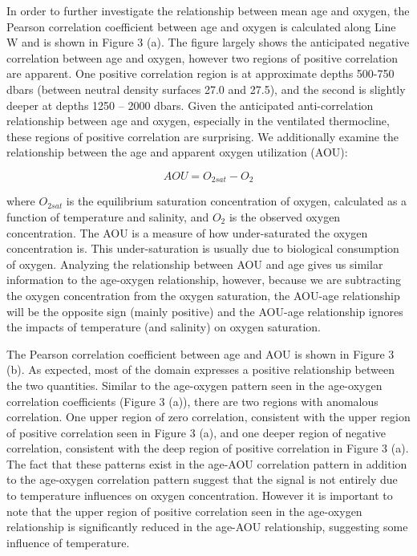 \documentclass{ametsoc}
\begin{document}
In order to further investigate the relationship between mean age and oxygen, the Pearson correlation coefficient between age and oxygen is calculated along Line W and is shown in Figure 3 (a).  The figure largely shows the anticipated negative correlation between age and oxygen, however two regions of positive correlation are apparent. One positive correlation region is at approximate depths 500-750 dbars (between neutral density surfaces 27.0 and 27.5), and the second is slightly deeper at depths 1250 – 2000 dbars. Given the anticipated anti-correlation relationship between age and oxygen, especially in the ventilated thermocline, these regions of positive correlation are surprising. We additionally examine the relationship between the age and apparent oxygen utilization (AOU):

\begin{equation}
  AOU =  O_{2 sat} - O_2
\end{equation}

where $O_{2 sat}$ is the equilibrium saturation concentration of oxygen, calculated as a function of temperature and salinity, and $O_2$ is the observed oxygen concentration. The AOU is a measure of how under-saturated the oxygen concentration is. This under-saturation is usually due to biological consumption of oxygen. Analyzing the relationship between AOU and age gives us similar information to the age-oxygen relationship, however, because we are subtracting the oxygen concentration from the oxygen saturation, the AOU-age relationship will be the opposite sign (mainly positive) and the AOU-age relationship ignores the impacts of temperature (and salinity) on oxygen saturation.

The Pearson correlation coefficient between age and AOU is shown in Figure 3 (b). As expected, most of the domain expresses a positive relationship between the two quantities. Similar to the age-oxygen pattern seen in the age-oxygen correlation coefficients (Figure 3 (a)), there are two regions with anomalous correlation. One upper region of zero correlation, consistent with the upper region of positive correlation seen in Figure 3 (a), and one deeper region of negative correlation, consistent with the deep region of positive correlation in Figure 3 (a). The fact that these patterns exist in the age-AOU correlation pattern in addition to the age-oxygen correlation pattern suggest that the signal is not entirely due to temperature influences on oxygen concentration. However it is important to note that the upper region of positive correlation seen in the age-oxygen relationship is significantly reduced in the age-AOU relationship, suggesting some influence of temperature.
\end{document}
